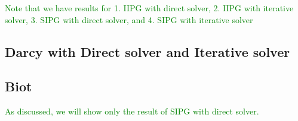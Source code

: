 \documentclass{article}
\newcommand{\meen}[1]{{\textcolor{green}{#1}}}
\begin{document}
\meen{Note that we have results for 1. IIPG with direct solver, 2. IIPG with iterative solver, 3. SIPG with direct solver, and 4. SIPG with iterative solver}

\subsection{Darcy with Direct solver and Iterative solver}

\subsection{Biot}

\meen{As discussed, we will show only the result of SIPG with direct solver.}


\end{document}
